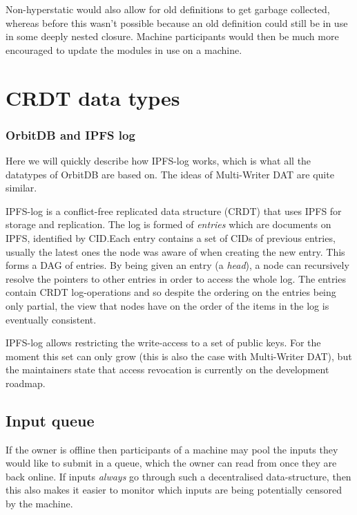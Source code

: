 \documentclass[a4paper, oneside, 10pt]{amsart}
\begin{document}
Non-hyperstatic would also allow for old definitions to get garbage
collected, whereas before this wasn't possible because an old definition
could still be in use in some deeply nested closure. Machine
participants would then be much more encouraged to update the modules in
use on a machine.

\section{CRDT data types}

\subsubsection{OrbitDB and IPFS log}

Here we will quickly describe how IPFS-log works, which is what all the
datatypes of OrbitDB are based on. The ideas of Multi-Writer DAT are quite
similar.

IPFS-log is a conflict-free replicated data structure (CRDT) that uses IPFS for
storage and replication. The log is formed of \emph{entries} which are documents
on IPFS, identified by CID.\@ Each entry contains a set of CIDs of previous
entries, usually the latest ones the node was aware of when creating the new
entry. This forms a DAG of entries. By being given an entry (a \emph{head}), a
node can recursively resolve the pointers to other entries in order to access
the whole log. The entries contain CRDT log-operations and so despite the
ordering on the entries being only partial, the view that nodes have on the
order of the items in the log is eventually consistent.

IPFS-log allows restricting the write-access to a set of public keys. For the
moment this set can only grow (this is also the case with Multi-Writer DAT), but
the maintainers state that access revocation is currently on the development
roadmap.

\subsection{Input queue}

If the owner is offline then participants of a machine may pool the inputs they
would like to submit in a queue, which the owner can read from once they are
back online. If inputs \emph{always} go through such a decentralised
data-structure, then this also makes it easier to monitor which inputs are being
potentially censored by the machine.
\end{document}
